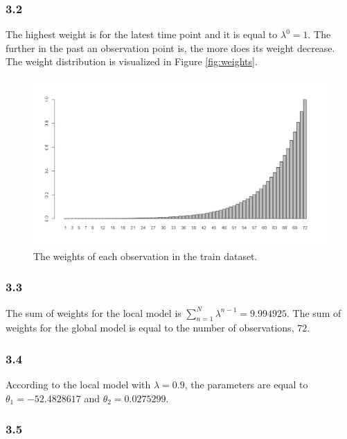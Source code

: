 \documentclass[
]{article}
\begin{document}
\subsubsection{3.2}\label{section-9}

The highest weight is for the latest time point and it is equal to
\(\lambda^0 = 1\). The further in the past an observation point is, the
more does its weight decrease. The weight distribution is visualized in
Figure \ref{fig:weights}.

\begin{figure}

{\centering \includegraphics[width=0.7\linewidth]{plots/weights_wls} 

}

\caption{\label{fig:weights}The weights of each observation in the train dataset.}\label{fig:unnamed-chunk-4}
\end{figure}

\subsubsection{3.3}\label{section-10}

The sum of weights for the local model is
\(\sum_{n=1}^{N} \lambda^{n-1} = 9.994925\). The sum of weights for the
global model is equal to the number of observations, \(72\).

\subsubsection{3.4}\label{section-11}

According to the local model with \(\lambda = 0.9\), the parameters are
equal to \(\theta_1=-52.4828617\) and \(\theta_2=0.0275299\).

\subsubsection{3.5}\label{section-12}
\end{document}
